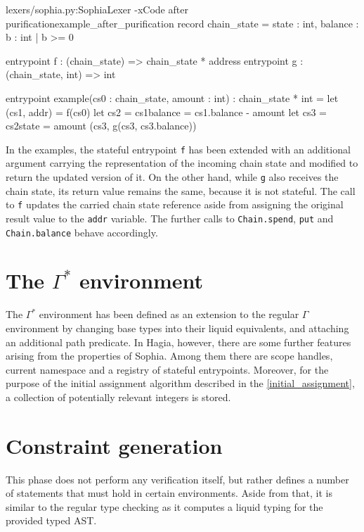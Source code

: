 \begin{code}[h]{lexers/sophia.py:SophiaLexer -x}{Code after purification}{example_after_purification}
record chain_state =
  { state    : int,
    balance  : {b : int | b >= 0} }

entrypoint f : (chain_state) => chain_state * address
entrypoint g : (chain_state, int) => int

entrypoint example(cs0 : chain_state, amount : int) : chain_state * int =
  let (cs1, addr) = f(cs0)
  let cs2 = cs1{balance = cs1.balance - amount}
  let cs3 = cs2{state = amount}
  (cs3, g(cs3, cs3.balance))
\end{code}

In the examples, the stateful entrypoint \texttt{f} has been extended with an
additional argument carrying the representation of the incoming chain state and
modified to return the updated version of it. On the other hand, while
\texttt{g} also receives the chain state, its return value remains the same,
because it is not stateful. The call to \texttt{f} updates the carried chain
state reference aside from assigning the original result value to the
\texttt{addr} variable. The further calls to \texttt{Chain.spend}, \texttt{put}
and \texttt{Chain.balance} behave accordingly.

\section{The $\Gamma^*$ environment}

The $\Gamma^*$ environment has been defined as an extension to the regular
$\Gamma$ environment by changing base types into their liquid equivalents, and
attaching an additional path predicate. In Hagia, however, there are some
further features arising from the properties of Sophia. Among them there are
scope handles, current namespace and a registry of stateful entrypoints.
Moreover, for the purpose of the initial assignment algorithm described in the
\autoref{initial_assignment}, a collection of potentially relevant integers is
stored.

\section{Constraint generation}

This phase does not perform any verification itself, but rather defines a number
of statements that must hold in certain environments. Aside from that, it is
similar to the regular type checking as it computes a liquid typing for the
provided typed AST.

